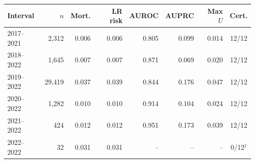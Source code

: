 \begin{tabular}{lrrrrrrc}
\toprule
Interval & $n$ & Mort. & LR risk & AUROC & AUPRC & Max $U$ & Cert. \\
\midrule
2017--2021 & 2,312 & 0.006 & 0.006 & 0.805 & 0.099 & 0.014 & 12/12 \\
2018--2022 & 1,645 & 0.007 & 0.007 & 0.871 & 0.069 & 0.020 & 12/12 \\
2019--2022 & 29,419 & 0.037 & 0.039 & 0.844 & 0.176 & 0.047 & 12/12 \\
2020--2022 & 1,282 & 0.010 & 0.010 & 0.914 & 0.104 & 0.024 & 12/12 \\
2021--2022 & 424 & 0.012 & 0.012 & 0.951 & 0.173 & 0.039 & 12/12 \\
2022--2022 & 32 & 0.031 & 0.031 & -- & -- & -- & 0/12$^\dagger$ \\
\bottomrule
\end{tabular}
